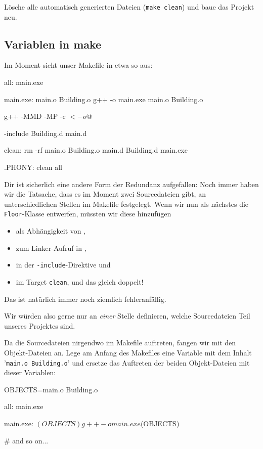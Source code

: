 Lösche alle automatisch generierten Dateien (\texttt{make clean}) und baue das Projekt neu.

\subsection{Variablen in make}

Im Moment sieht unser Makefile in etwa so aus:
\begin{lstmake}
all: main.exe

main.exe: main.o Building.o
    g++ -o main.exe main.o Building.o

    g++ -MMD -MP -c $< -o $@

-include Building.d main.d

clean:
    rm -rf main.o Building.o main.d Building.d main.exe
    
.PHONY: clean all
\end{lstmake}

Dir ist sicherlich eine andere Form der Redundanz aufgefallen:
Noch immer haben wir die Tatsache, dass es im Moment zwei Sourcedateien gibt, an unterschiedlichen Stellen im Makefile festgelegt.
Wenn wir nun als nächstes die \lstinline{Floor}-Klasse entwerfen, müssten wir diese hinzufügen
\begin{itemize}
    \item als Abhängigkeit von ,
    \item zum Linker-Aufruf in ,
    \item in der \lstinline{-include}-Direktive und
    \item im Target \lstinline{clean}, und das gleich doppelt!
\end{itemize}
Das ist natürlich immer noch ziemlich fehleranfällig.

Wir würden also gerne nur an \emph{einer} Stelle definieren, welche Sourcedateien Teil unseres Projektes sind.

Da die Sourcedateien nirgendwo im Makefile auftreten, fangen wir mit den Objekt-Dateien an.
Lege am Anfang des Makefiles eine Variable mit dem Inhalt '\lstinline{main.o Building.o}' und ersetze das Auftreten der beiden Objekt-Dateien mit dieser Variablen:

\begin{minipage}{\textwidth}
\begin{lstmake}
OBJECTS=main.o Building.o

all: main.exe

main.exe: $(OBJECTS)
    g++ -o main.exe $(OBJECTS)
    
# and so on...
\end{lstmake}
\end{minipage}

